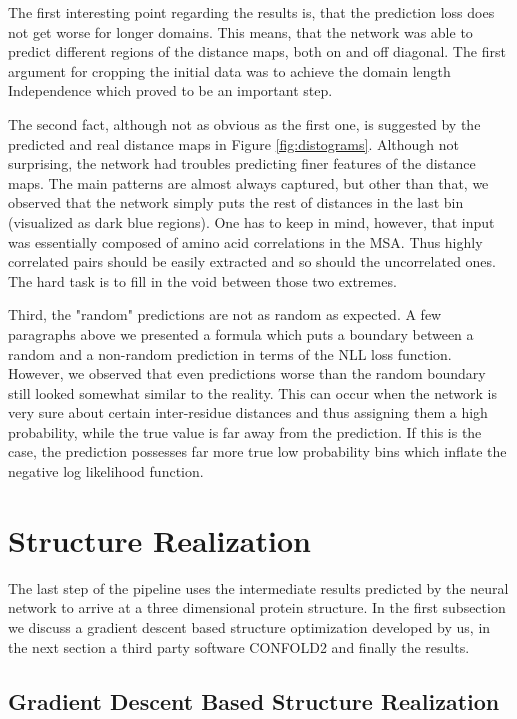 The first interesting point regarding the results is, that the prediction loss does not get worse for longer domains. This means, that the network was able to predict different regions of the distance maps, both on and off diagonal. The first argument for cropping the initial data was to achieve the domain length Independence which proved to be an important step.

The second fact, although not as obvious as the first one, is suggested by the predicted and real distance maps in Figure \ref{fig:distograms}. Although not surprising, the network had troubles predicting finer features of the distance maps. The main patterns are almost always captured, but other than that, we observed that the network simply puts the rest of distances in the last bin (visualized as dark blue regions). One has to keep in mind, however, that input was essentially composed of amino acid correlations in the MSA. Thus highly correlated pairs should be easily extracted and so should the uncorrelated ones. The hard task is to fill in the void between those two extremes.

Third, the "random" predictions are not as random as expected. A few paragraphs above we presented a formula which puts a boundary between a random and a non-random prediction in terms of the NLL loss function. However, we observed that even predictions worse than the random boundary still looked somewhat similar to the reality. This can occur when the network is very sure about certain inter-residue distances and thus assigning them a high probability, while the true value is far away from the prediction. If this is the case, the prediction possesses far more true low probability bins which inflate the negative log likelihood function.

\section{Structure Realization}

The last step of the pipeline uses the intermediate results predicted by the neural network to arrive at a three dimensional protein structure. In the first subsection we discuss a gradient descent based structure optimization developed by us, in the next section a third party software CONFOLD2 and finally the results. 

\subsection{Gradient Descent Based Structure Realization}


